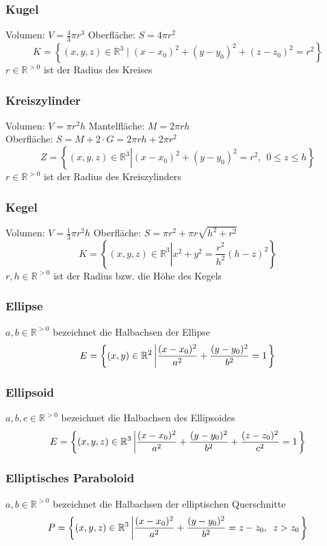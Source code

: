 \documentclass[8pt, a4paper, landscape, fleqn]{scrartcl}
\begin{document}
\begin{multicols*}{3}
				\subsubsection{Kugel}
					Volumen: $V=\frac{4}{3}\pi r^3$ \hspace{15pt} Oberfläche: $S=4\pi r^2$
					\[K=\left\{(x, y, z)\in \mathbb{R}^3 \mid (x-x_0)^2+(y-y_0)^2+(z-z_0)^2 = r^2 \right\}\]
					$r \in \mathbb{R}^{>0}$ ist der Radius des Kreises
				\subsubsection{Kreiszylinder}
					Volumen: $V=\pi r^2 h$ \hspace{20pt} Mantelfläche: $M=2\pi r h$\\
					Oberfläche: $S=M+2\cdot G=2\pi r h+2\pi r^2$
					\[Z=\left\{(x, y, z)\in \mathbb{R}^3 \left \vert  (x-x_0)^2+(y-y_0)^2 =r^2, \hspace{5pt} 0\le z \le h \right. \right\}\]
					$r \in \mathbb{R}^{>0}$ ist der Radius des Kreiszylinders
				\subsubsection{Kegel}
					Volumen: $V=\frac{1}{3}\pi r^2h$ \hspace{12pt} Oberfläche: $S=\pi r^2+\pi r\sqrt{h^2+r^2}$
					\[K=\left\{(x, y, z)\in \mathbb{R}^3 \left \vert  x^2+y^2 = \frac{r^2}{h^2}(h-z)^2 \right. \right\}\]
					$r, h \in \mathbb{R}^{>0}$ ist der Radius bzw. die Höhe des Kegels
				\subsubsection{Ellipse}
					$a, b \in \mathbb{R}^{>0}$ bezeichnet die Halbachsen der Ellipse
					\[E=\left\{(x, y)\in \mathbb{R}^2 \large \left \vert \frac{(x-x_0)^2}{a^2}+\frac{(y-y_0)^2 }{b^2}= 1 \right. \right\}\]
				\subsubsection{Ellipsoid}
					$a, b, c \in \mathbb{R}^{>0}$ bezeichnet die Halbachsen des Ellipsoides
					\[E=\left\{(x, y, z)\in \mathbb{R}^3 \large \left \vert  \frac{(x-x_0)^2}{a^2}+\frac{(y-y_0)^2}{b^2} +\frac{(z-z_0)^2}{c^2}= 1 \right. \right\}\]
				\subsubsection{Elliptisches Paraboloid}
					$a, b \in \mathbb{R}^{>0}$ bezeichnet die Halbachsen der elliptischen Querschnitte
					\[P=\left\{(x, y, z)\in \mathbb{R}^3 \large \left \vert  \frac{(x-x_0)^2}{a^2}+\frac{(y-y_0)^2}{b^2}= z-z_0, \hspace{5pt} z>z_0 \right. \right\}\]

\end{multicols*}
\end{document}
